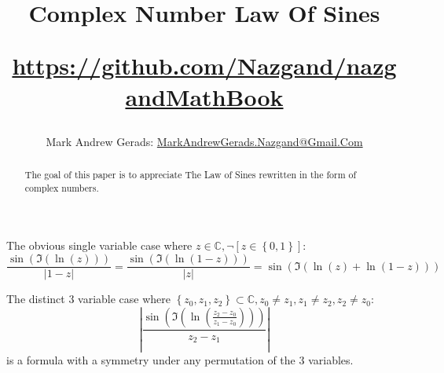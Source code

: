 \documentclass[]{article}
\author{Mark Andrew Gerads: \href{MailTo:MarkAndrewGerads.Nazgand@Gmail.Com}{MarkAndrewGerads.Nazgand@Gmail.Com}}
\title{
	Complex Number Law Of Sines
	
	\href{https://github.com/Nazgand/nazgandMathBook}{https://github.com/Nazgand/nazgandMathBook}
}
\newcommand{\pqty}[1]{{\left(#1\right)}}
\newcommand{\Bqty}[1]{{\left\{#1\right\}}}
\newcommand{\bqty}[1]{{\left[#1\right]}}
\newcommand{\abs}[1]{{\left\lvert#1\right\rvert}}
\numberwithin{equation}{section}
\begin{document}
	
	\maketitle
	
	\begin{abstract}
		The goal of this paper is to appreciate The Law of Sines rewritten in the form of complex numbers.
	\end{abstract}
	
	The obvious single variable case where $z\in\mathbb{C},\lnot\bqty{z\in\Bqty{0,1}}$:
	\begin{equation}
		\frac{\sin\pqty{\Im\pqty{\ln\pqty{z}}}}{\abs{1-z}}=
		\frac{\sin\pqty{\Im\pqty{\ln\pqty{1-z}}}}{\abs{z}}=
		\sin\pqty{\Im\pqty{\ln\pqty{z}+\ln\pqty{1-z}}}
	\end{equation}

	The distinct 3 variable case where $\Bqty{z_0,z_1,z_2}\subset\mathbb{C},z_0\neq z_1,z_1\neq z_2,z_2\neq z_0$:
	\begin{equation}
		\abs{\frac{\sin\pqty{\Im\pqty{\ln\pqty{\frac{z_2-z_0}{z_1-z_0}}}}}{z_2-z_1}}
	\end{equation}
	is a formula with a symmetry under any permutation of the 3 variables.
\end{document}
